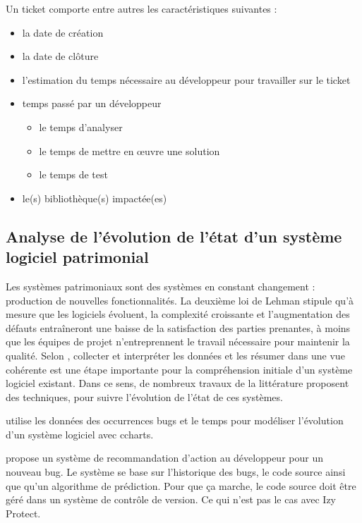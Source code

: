 \documentclass[a4paper]{article}
\begin{document}
Un ticket comporte entre autres les caractéristiques suivantes :

\begin{itemize}
\item la date de création
\item la date de clôture
\item l'estimation du temps nécessaire au développeur pour travailler sur le ticket
\item temps passé par un développeur
\begin{itemize}
\item le temps d'analyser
\item le temps de mettre en œuvre une solution
\item le temps de test
\end{itemize}
\item le(s) bibliothèque(s) impactée(es)
\end{itemize}


\subsection{Analyse de l'évolution de l'état d'un système logiciel patrimonial}
\label{sec:etatLogiciel}
Les systèmes patrimoniaux sont des systèmes en constant changement : production de nouvelles fonctionnalités.
La deuxième loi de Lehman \cite{Lehm96a} stipule qu'à mesure que les logiciels évoluent, la complexité croissante et l'augmentation des défauts entraîneront une baisse de la satisfaction des parties prenantes, à moins que les équipes de projet n'entreprennent le travail nécessaire pour maintenir la qualité.
Selon \citet{Deme02a}, collecter et interpréter les données et les résumer dans une vue cohérente est une étape importante pour la compréhension initiale d'un système logiciel existant.
Dans ce sens, de nombreux travaux de la littérature proposent des techniques, pour suivre l'évolution de l'état de ces systèmes.

\citet{Zhan10b} utilise les données des occurrences bugs et le temps pour modéliser l'évolution d'un système logiciel avec c\-charts.

\citet{lenar17} propose un système de recommandation d'action au développeur pour un nouveau bug. Le système se base sur l'historique des bugs, le code source ainsi que qu'un algorithme de prédiction. Pour que ça marche, le code source doit être géré dans un système de contrôle de version. Ce qui n'est pas le cas avec Izy Protect.
\end{document}
